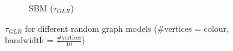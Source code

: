 \begin{figure}[h]
\begin{subfigure}{0.3\columnwidth}
    \caption{SBM ($\tau_{GLR}$)}%
    \label{tau_GLR_SBM}%
    \end{subfigure}%
    \hfill
    \caption{$\tau_{GLR}$  for different random graph models (\#vertices = colour, bandwidth = $\frac{\text{\# vertices}}{10}$)}
\label{GLR_Threshold_plots}
\end{figure}


